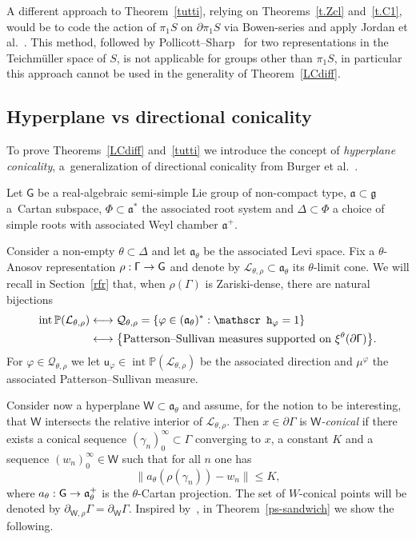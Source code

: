 \documentclass[AHL,Unicode,longabstracts,MathTools]{cedram}
\DeclareMathOperator{\inte}{int}
\newcommand{\cartan}{a}
\newcommand{\scr}{\mathscr}
\newcommand{\hJ}[1]{{\scr h}_{#1}}
\renewcommand{\sf}[1]{{\mathsf{#1}}}
\newcommand{\sfG}{\sf{G}}
\newcommand{\G}{\sf{\Gamma}}
\newcommand{\roots}{\mathsf{\Phi}}
\newcommand{\cal}{\mathcal}
\newcommand{\calL}{\mathcal{L}}
\newcommand{\calQ}{\mathcal{Q}}
\renewcommand{\P}{\mathbb{P}}
\newcommand{\g}{\gamma}
\renewcommand{\t}{\theta}
\newcommand{\bord}{\partial}
\newcommand{\piS}{\pi_1S}
\newcommand{\simple}{{\sf \Delta}}
\renewcommand{\/}{\backslash}
\newcommand{\<}{\langle}
\renewcommand{\>}{\rangle}
\renewcommand{\ge}{\mathfrak{g}}
\renewcommand{\a}{\mathfrak{a}}
\renewcommand*{\to}{\mathchoice{\longrightarrow}{\rightarrow}{\rightarrow}{\rightarrow}}
\let\oldleftrightarrow\leftrightarrow
\renewcommand*{\leftrightarrow}{\mathchoice{\longleftrightarrow}{\oldleftrightarrow}{\oldleftrightarrow}{\oldleftrightarrow}}
\let\originalleft\left
\let\originalright\right
\renewcommand{\left}{\mathopen{}\mathclose\bgroup\originalleft}
\renewcommand{\right}{\aftergroup\egroup\originalright}
\begin{document}
\begin{rema}
A different approach to Theorem~\ref{tutti}, relying on Theorems~\ref{t.Zcl} and~\ref{t.C1}, would be to code the action of $\piS$ on $\bord\piS$ via Bowen-series and apply Jordan et al.~\cite[Theorem~1.1]{JKPS}. This method, followed by Pollicott--Sharp~\cite{PS} for two representations in the Teichm\"uller space of $S$, is not applicable for groups other than $\piS$, in particular this approach cannot be used in the generality of Theorem~\ref{LCdiff}.
\end{rema}


\subsection{Hyperplane vs directional conicality}

To prove Theorems~\ref{LCdiff} and~\ref{tutti} we introduce the concept of \emph{hyperplane conicality}, a~generalization of directional conicality from Burger et al.~\cite{BLLO}.

Let $\sfG$ be a real-algebraic semi-simple Lie group of non-compact type, $\a\subset\ge$ a~Cartan subspace, $\roots\subset\a^*$ the associated root system and $\simple\subset\roots$ a choice of simple roots with associated Weyl chamber $\a^+$.


Consider a non-empty $\t\subset\simple$ and let $\a_\t$ be the associated Levi space. Fix a $\t$-Anosov representation $\rho:\G\to\sfG$ and denote by $\cal L_{\t,\rho}\subset\a_\t$ its $\t$-limit cone. We will recall in Section~\ref{rfr} that, when $\rho(\G)$ is Zariski-dense, there are natural bijections
\begin{align*}
\inte\P(\cal L_{\t,\rho})& \leftrightarrow\calQ_{\t,\rho}=
\left\{\varphi \in(\a_\t)^*:\hJ\varphi=1\right\} \\
&\leftrightarrow \left\{\text{Patterson--Sullivan measures supported on $\xi^\t(\bord\G)$}\right\}.
\end{align*}
For $\varphi\in\calQ_{\t,\rho}$ we let $\sf u_\varphi\in \inte\P(\cal L_{\t,\rho})$ be the associated direction and $\mu^\varphi$ the associated Patterson--Sullivan measure.


Consider now a hyperplane $\sf W\subset\a_\t$ and assume, for the notion to be interesting, that $\sf W$ intersects the relative interior of $\calL_{\t,\rho}$. Then $x\in\bord\G$ is \emph{$\sf W$-conical} if there exists a conical sequence $(\g_n)_0^\infty\subset\G$ converging to $x$, a constant $K$ and a sequence $(w_n)_0^\infty\in\sf W$ such that for all $n$ one has
\[
\bigl\|\cartan_\t(\rho(\g_n))- w_n\bigr\|\leq K,
\]
where $\cartan_\t:\sfG\to\a^+_\t$ is the $\t$-Cartan projection. The set of $W$-conical points will be denoted by $\bord_{\sf W,\rho}\G=\bord_{\sf W}\G$. Inspired by~\cite{BLLO}, in Theorem~\ref{ps-sandwich} we show the following.
\end{document}
